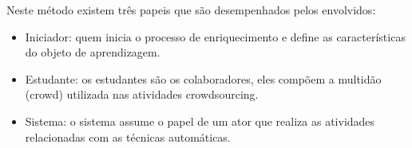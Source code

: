Neste método existem três papeis que são desempenhados pelos envolvidos:
\begin{itemize}
    \item Iniciador: quem inicia o processo de enriquecimento e define as características do objeto de aprendizagem.
    \item Estudante: os estudantes são os colaboradores, eles compõem a multidão (crowd) utilizada nas atividades crowdsourcing.
    \item Sistema: o sistema assume o papel de um ator que realiza as atividades relacionadas com as técnicas automáticas.
\end{itemize}